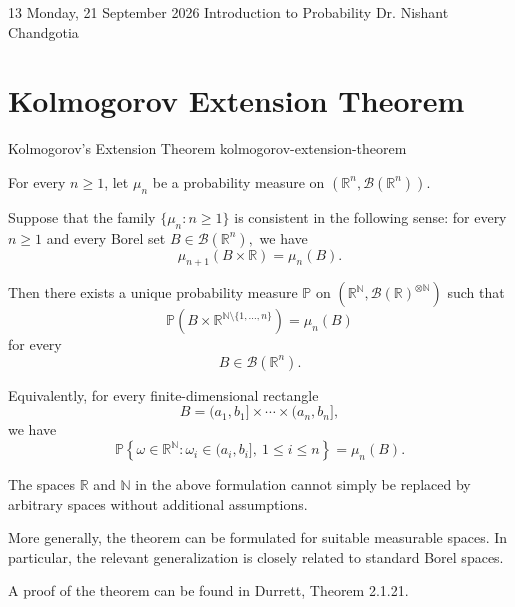 
\lecture
{13}
{Monday, 21 September 2026}
{Introduction to Probability}
{Dr. Nishant Chandgotia}



\section{Kolmogorov Extension Theorem}

\begin{theorem}{Kolmogorov's Extension Theorem}
{kolmogorov-extension-theorem}

For every $n\geq1$, let
\(
\mu_n
\)
be a probability measure on
\(
\left(\mathbb{R}^n,\mathcal{B}(\mathbb{R}^n)\right).
\)

Suppose that the family
\(
\{\mu_n:n\geq1\}
\)
is consistent in the following sense: for every $n\geq1$ and every
Borel set
\(
B\in\mathcal{B}(\mathbb{R}^n),
\)
we have
\[
\mu_{n+1}(B\times\mathbb{R})
=
\mu_n(B).
\]

Then there exists a unique probability measure
\(
\mathbb{P}
\)
on
\(
\left(
\mathbb{R}^{\mathbb{N}},
\mathcal{B}(\mathbb{R})^{\otimes\mathbb{N}}
\right)
\)
such that
\[
\mathbb{P}
\left(
B\times\mathbb{R}^{\mathbb{N}\setminus\{1,\ldots,n\}}
\right)
=
\mu_n(B)
\]
for every
\[
B\in\mathcal{B}(\mathbb{R}^n).
\]

Equivalently, for every finite-dimensional rectangle
\[
B=(a_1,b_1]\times\cdots\times(a_n,b_n],
\]
we have
\[
\mathbb{P}
\left\{
\omega\in\mathbb{R}^{\mathbb{N}}:
\omega_i\in(a_i,b_i],
\ 1\leq i\leq n
\right\}
=
\mu_n(B).
\]

\end{theorem}


\begin{remark}

The spaces $\mathbb{R}$ and $\mathbb{N}$ in the above formulation
cannot simply be replaced by arbitrary spaces without additional
assumptions.

More generally, the theorem can be formulated for suitable measurable
spaces. In particular, the relevant generalization is closely related
to standard Borel spaces.

A proof of the theorem can be found in Durrett, Theorem 2.1.21.

\end{remark}


